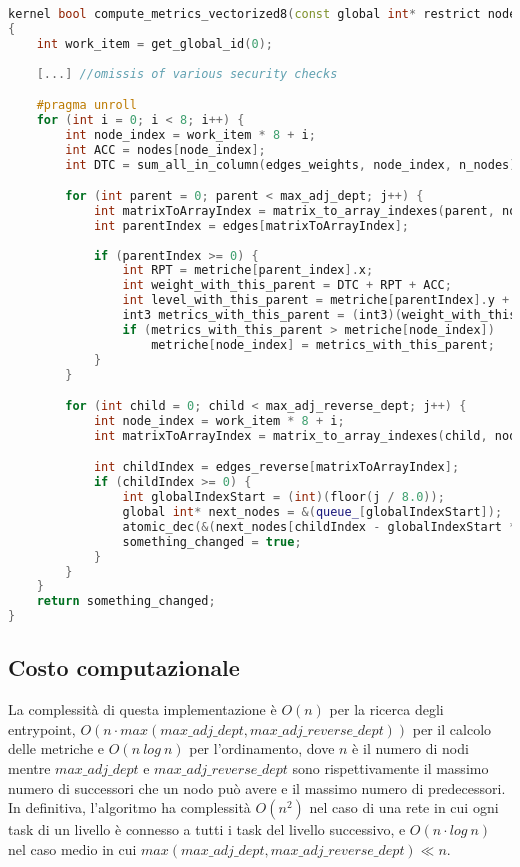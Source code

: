 \begin{lstlisting}[language=C++, caption={Vectorized compute metrics kernel},captionpos=b]
kernel bool compute_metrics_vectorized8(const global int* restrict nodes, global int8* restrict queue_, const global edge_t* restrict edges, const global edge_t* restrict edges_reverse, const global edge_t* restrict edges_weights, global int3* metriche, const int max_adj_dept, const int max_adj_reverse_dept, const int n_nodes)
{
	int work_item = get_global_id(0);
	
	[...] //omissis of various security checks

	#pragma unroll
	for (int i = 0; i < 8; i++) {
		int node_index = work_item * 8 + i;
		int ACC = nodes[node_index];
		int DTC = sum_all_in_column(edges_weights, node_index, n_nodes);

		for (int parent = 0; parent < max_adj_dept; j++) {
			int matrixToArrayIndex = matrix_to_array_indexes(parent, node_index, n_nodes);
			int parentIndex = edges[matrixToArrayIndex];
			
			if (parentIndex >= 0) {
				int RPT = metriche[parent_index].x;
				int weight_with_this_parent = DTC + RPT + ACC;
				int level_with_this_parent = metriche[parentIndex].y + 1;
				int3 metrics_with_this_parent = (int3)(weight_with_this_parent, level_with_this_parent, node_index);
				if (metrics_with_this_parent > metriche[node_index])
					metriche[node_index] = metrics_with_this_parent;
			}
		}

		for (int child = 0; child < max_adj_reverse_dept; j++) {
			int node_index = work_item * 8 + i;
			int matrixToArrayIndex = matrix_to_array_indexes(child, node_index, n_nodes);

			int childIndex = edges_reverse[matrixToArrayIndex];
			if (childIndex >= 0) {
				int globalIndexStart = (int)(floor(j / 8.0));
				global int* next_nodes = &(queue_[globalIndexStart]);
				atomic_dec(&(next_nodes[childIndex - globalIndexStart * 8]));
				something_changed = true;
			}
		}
	}
	return something_changed;
}
\end{lstlisting}


\subsection{Costo computazionale}
La complessità di questa implementazione è $O(n)$ per la ricerca degli entrypoint, $O(n \cdot max(max\_adj\_dept, max\_adj\_reverse\_dept))$ per il calcolo delle metriche e $O(n\ log\ n)$ per l'ordinamento, dove $n$ è il numero di nodi mentre $max\_adj\_dept$ e $max\_adj\_reverse\_dept$ sono rispettivamente il massimo numero di successori che un nodo può avere e il massimo numero di predecessori.
In definitiva, l'algoritmo ha complessità $O(n^{2})$ nel caso di una rete in cui ogni task di un livello è connesso a tutti i task del livello successivo, e $O(n \cdot log\ n)$ nel caso medio in cui $max(max\_adj\_dept, max\_adj\_reverse\_dept) \ll n$.